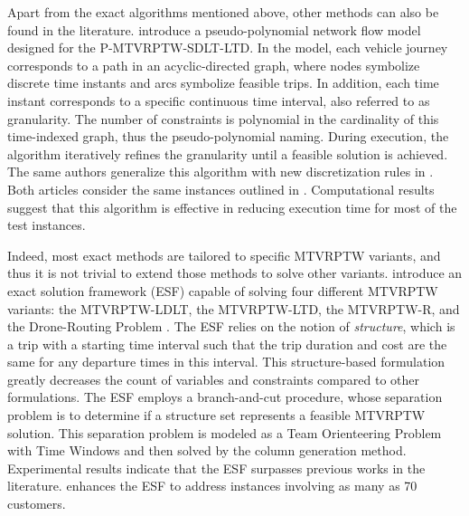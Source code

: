 Apart from the exact algorithms mentioned above, other methods can also be found in the literature.  \cite{macedo2011solving} introduce a pseudo-polynomial network flow model designed for the P-MTVRPTW-SDLT-LTD.  In the model, each vehicle journey corresponds to a path in an acyclic-directed graph, where nodes symbolize discrete time instants and arcs symbolize feasible trips.  In addition, each time instant corresponds to a specific continuous time interval, also referred to as granularity.  The number of constraints is polynomial in the cardinality of this time-indexed graph, thus the pseudo-polynomial naming.  During execution, the algorithm iteratively refines the granularity until a feasible solution is achieved.  The same authors generalize this algorithm with new discretization rules in \cite{macedo2012generalized}.  Both articles consider the same instances outlined in \cite{azi2010exact}.  Computational results suggest that this algorithm is effective in reducing execution time for most of the test instances.
\newline

Indeed, most exact methods are tailored to specific MTVRPTW variants, and thus it is not trivial to extend those methods to solve other variants.  \cite{paradiso2020exact} introduce an exact solution framework (ESF) capable of solving four different MTVRPTW variants: the MTVRPTW-LDLT, the MTVRPTW-LTD, the MTVRPTW-R, and the Drone-Routing Problem \citep[e.g.,][]{cheng2018formulations}.  The ESF relies on the notion of \textit{structure}, which is a trip with a starting time interval such that the trip duration and cost are the same for any departure times in this interval.  This structure-based formulation greatly decreases the count of variables and constraints compared to other formulations.  The ESF employs a branch-and-cut procedure, whose separation problem is to determine if a structure set represents a feasible MTVRPTW solution.  This separation problem is modeled as a Team Orienteering Problem with Time Windows \citep[see, e.g.,][]{vansteenwegen2009iterated} and then solved by the column generation method.  Experimental results indicate that the ESF surpasses previous works in the literature.  \cite{yang2023exact} enhances the ESF \citep{paradiso2020exact} to address instances involving as many as 70 customers.
\newline

